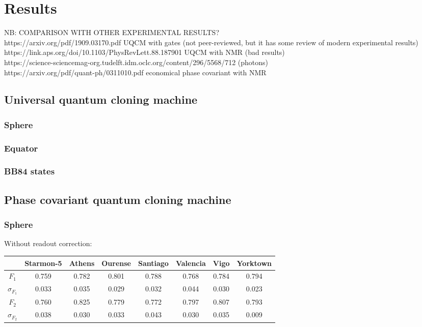 \chapter{Results}
\label{sec:results}
NB: COMPARISON WITH OTHER EXPERIMENTAL RESULTS?\\
https://arxiv.org/pdf/1909.03170.pdf UQCM with gates (not peer-reviewed, but it has some review of modern experimental results)\\
https://link.aps.org/doi/10.1103/PhysRevLett.88.187901 UQCM with NMR (bad results)\\
https://science-sciencemag-org.tudelft.idm.oclc.org/content/296/5568/712 (photons)\\
https://arxiv.org/pdf/quant-ph/0311010.pdf economical phase covariant with NMR\\

\section{Universal quantum cloning machine}
\subsection{Sphere}
\subsection{Equator}
\subsection{BB84 states}
\section{Phase covariant quantum cloning machine}
\subsection{Sphere}

Without readout correction:
\begin{table}[H]
    \centering
    \begin{tabular}{|c|c|c|c|c|c|c|c|}
    \hline
    \textbf{} & \textbf{Starmon-5} & \textbf{Athens} & \textbf{Ourense} & \textbf{Santiago} & \textbf{Valencia} & \textbf{Vigo} & \textbf{Yorktown} \\ \hline
    $F_1$              & 0.759 & 0.782 & 0.801 & 0.788 & 0.768 & 0.784 & 0.794 \\ \hline
    $\sigma_{F_1}$     & 0.033 & 0.035 & 0.029 & 0.032 & 0.044 & 0.030 & 0.023 \\ \hline
    $F_2$              & 0.760 & 0.825 & 0.779 & 0.772 & 0.797 & 0.807 & 0.793 \\ \hline
    $\sigma_{F_2}$     & 0.038 & 0.030 & 0.033 & 0.043 & 0.030 & 0.035 & 0.009 \\ \hline
    \end{tabular}
\end{table}

